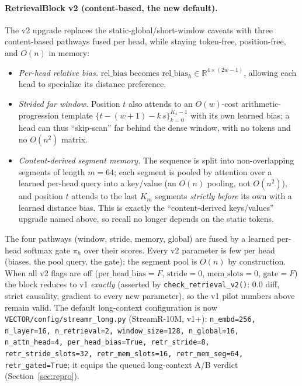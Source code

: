 \documentclass[11pt]{article}
\begin{document}
\paragraph{RetrievalBlock v2 (content-based, the new default).}
The v2 upgrade replaces the static-global/short-window caveats with three
content-based pathways fused per head, while staying token-free,
position-free, and $O(n)$ in memory:
\begin{itemize}
  \item \emph{Per-head relative bias.} $\mathrm{rel\_bias}$ becomes
        $\mathrm{rel\_bias}_h\in\mathbb{R}^{4\times(2w{-}1)}$, allowing each
        head to specialize its distance preference.
  \item \emph{Strided far window.} Position $t$ also attends to an
        $O(w)$-cost arithmetic-progression template
        $\{t{-}(w{+}1){-}k\,s\}_{k=0}^{K_s{-}1}$ with its own learned bias; a
        head can thus ``skip-scan'' far behind the dense window, with no tokens
        and no $O(n^2)$ matrix.
  \item \emph{Content-derived segment memory.} The sequence is split into
        non-overlapping segments of length $m{=}64$; each segment is pooled by
        attention over a learned per-head query into a key/value (an $O(n)$
        pooling, not $O(n^2)$), and position $t$ attends to the last $K_m$
        segments \emph{strictly before} its own with a learned distance bias.
        This is exactly the ``content-derived keys/values'' upgrade named
        above, so recall no longer depends on the static tokens.
\end{itemize}
The four pathways (window, stride, memory, global) are fused by a learned
per-head softmax gate $\pi_h$ over their scores. Every v2 parameter is few
per head (biases, the pool query, the gate); the segment pool is $O(n)$ by
construction. When all v2 flags are off
($\mathrm{per\_head\_bias}{=}F$, $\mathrm{stride}{=}0$,
$\mathrm{mem\_slots}{=}0$, $\mathrm{gate}{=}F$) the block reduces to v1
\emph{exactly} (asserted by \texttt{check\_retrieval\_v2()}: 0.0 diff,
strict causality, gradient to every new parameter), so the v1 pilot numbers
above remain valid. The default long-context configuration is now
\texttt{VECTOR/config/streamr\_long.py} (StreamR-10M, v1+):
\texttt{n\_embd=256, n\_layer=16, n\_retrieval=2, window\_size=128,
n\_global=16, n\_attn\_head=4, per\_head\_bias=True, retr\_stride=8,
retr\_stride\_slots=32, retr\_mem\_slots=16, retr\_mem\_seg=64,
retr\_gated=True}; it equips the queued long-context A/B verdict
(Section~\ref{sec:repro}).
\end{document}
